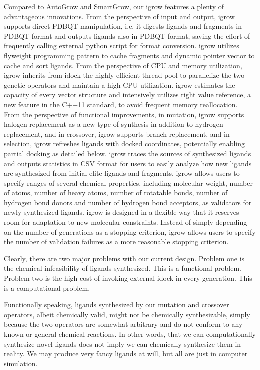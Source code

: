 Compared to AutoGrow and SmartGrow, our igrow features a plenty of advantageous innovations. From the perspective of input and output, igrow supports direct PDBQT manipulation, i.e. it digests ligands and fragments in PDBQT format and outputs ligands also in PDBQT format, saving the effort of frequently calling external python script for format conversion. igrow utilizes flyweight programming pattern to cache fragments and dynamic pointer vector to cache and sort ligands. From the perspective of CPU and memory utilization, igrow inherits from idock the highly efficient thread pool to parallelize the two genetic operators and maintain a high CPU utilization. igrow estimates the capacity of every vector structure and intensively utilizes right value reference, a new feature in the C++11 standard, to avoid frequent memory reallocation. From the perspective of functional improvements, in mutation, igrow supports halogen replacement as a new type of synthesis in addition to hydrogen replacement, and in crossover, igrow supports branch replacement, and in selection, igrow refreshes ligands with docked coordinates, potentially enabling partial docking as detailed below. igrow traces the sources of synthesized ligands and outputs statistics in CSV format for users to easily analyze how new ligands are synthesized from initial elite ligands and fragments. igrow allows users to specify ranges of several chemical properties, including molecular weight, number of atoms, number of heavy atoms, number of rotatable bonds, number of hydrogen bond donors and number of hydrogen bond acceptors, as validators for newly synthesized ligands. igrow is designed in a flexible way that it reserves room for adaptation to new molecular constraints. Instead of simply depending on the number of generations as a stopping criterion, igrow allows users to specify the number of validation failures as a more reasonable stopping criterion.

Clearly, there are two major problems with our current design. Problem one is the chemical infeasibility of ligands synthesized. This is a functional problem. Problem two is the high cost of invoking external idock in every generation. This is a computational problem.

Functionally speaking, ligands synthesized by our mutation and crossover operators, albeit chemically valid, might not be chemically synthesizable, simply because the two operators are somewhat arbitrary and do not conform to any known or general chemical reactions. In other words, that we can computationally synthesize novel ligands does not imply we can chemically synthesize them in reality. We may produce very fancy ligands at will, but all are just in computer simulation.

